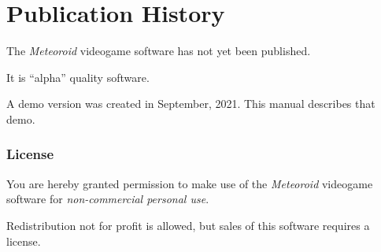 \documentclass[10pt,twocolumn,openany,article]{memoir}
\begin{document}
\vfill

\chapter*{Publication History}

The \textit{Meteoroid} videogame software has not yet been published.

It is ``alpha'' quality software.

A  demo version  was created  in September,  2021. \ifdefined\DEMO  This
manual describes that demo. \fi

\subsection{License}

You are hereby granted permission  to make use of the \textit{Meteoroid}
videogame software for \emph{non-commercial personal use}.

Redistribution not for profit is allowed, but sales of this software
requires a license.
\end{document}
